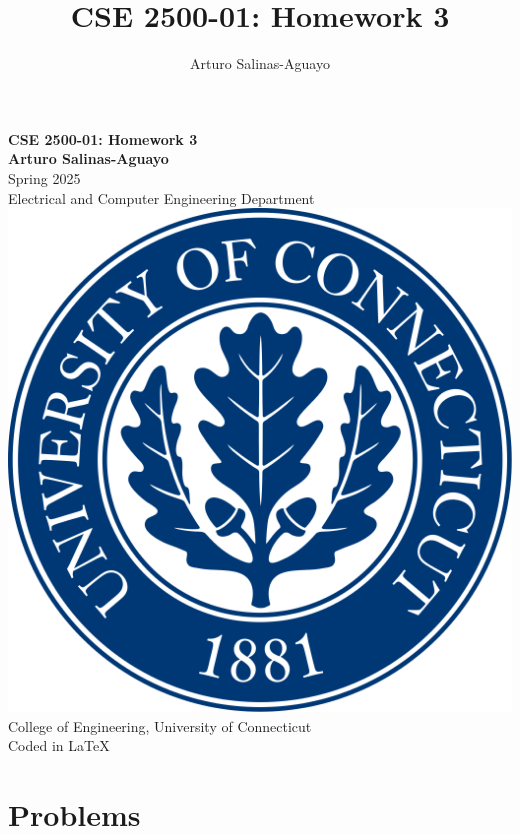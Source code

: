 \documentclass[12pt]{article}
\author{Arturo Salinas-Aguayo}
\title{CSE 2500-01: Homework 3}
\begin{document}
\newcommand{\closure}[2][3]{%
	{}\mkern#1mu\overline{\mkern-#1mu#2}}
\newcommand\ncoverline[1]{\mkern1mu\overline{\mkern-1mu#1\mkern-1mu}\mkern1mu}
\begin{titlepage}
	\centering
	\vspace*{3cm}
	\huge\textbf{CSE 2500-01: Homework 3}\\
	\vspace{5cm}
	\Large\textbf{Arturo Salinas-Aguayo}\\
	\normalsize
	Spring 2025\\
	Electrical and Computer Engineering Department\\
	\vfill
	\includegraphics[scale=0.1]{uconnlogo}\\
	College of Engineering, University of Connecticut\\
	\scriptsize{Coded in \LaTeX}
	\vspace*{1cm}
\end{titlepage}

\section*{Problems}
\end{document}
